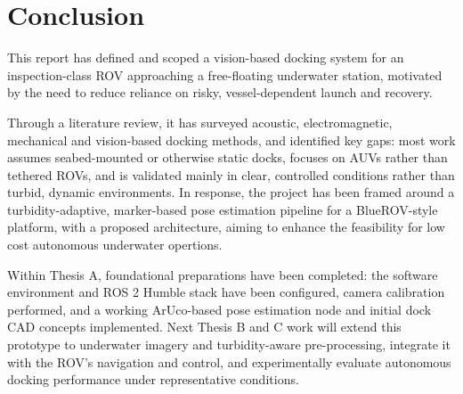 \section*{Conclusion} \label{sec:conclusion}
This report has defined and scoped a vision-based docking system for an inspection-class ROV approaching a free-floating underwater station, motivated by the need to reduce reliance on risky, vessel-dependent launch and recovery.

Through a literature review, it has surveyed acoustic, electromagnetic, mechanical and vision-based docking methods, and identified key gaps: most work assumes seabed-mounted or otherwise static docks, focuses on AUVs rather than tethered ROVs, and is validated mainly in clear, controlled conditions rather than turbid, dynamic environments. In response, the project has been framed around a turbidity-adaptive, marker-based pose estimation pipeline for a BlueROV-style platform, with a proposed architecture, aiming to enhance the feasibility for low cost autonomous underwater opertions.

Within Thesis A, foundational preparations have been completed: the software environment and ROS 2 Humble stack have been configured, camera calibration performed, and a working ArUco-based pose estimation node and initial dock CAD concepts implemented. Next Thesis B and C work will extend this prototype to underwater imagery and turbidity-aware pre-processing, integrate it with the ROV's navigation and control, and experimentally evaluate autonomous docking performance under representative conditions.